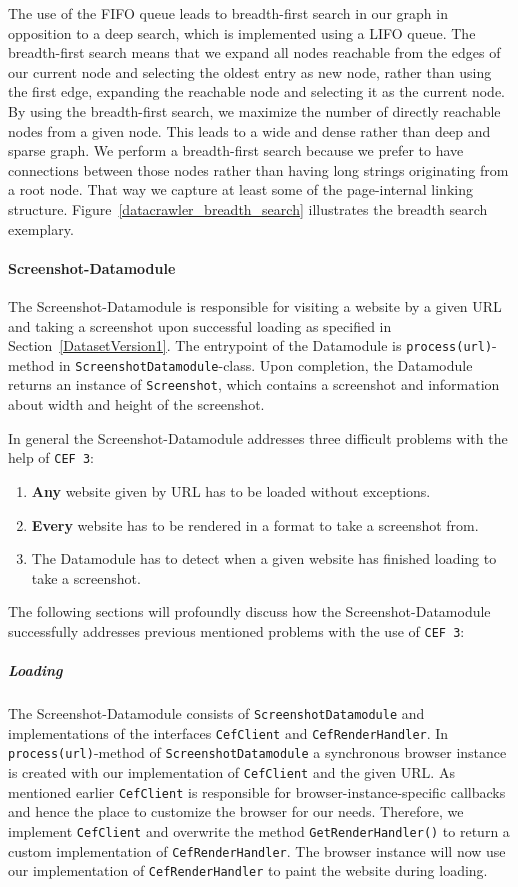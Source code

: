 The use of the FIFO queue leads to breadth-first search in our graph in opposition to a deep search, which is implemented using a LIFO queue. The breadth-first search means that we expand all nodes reachable from the edges of our current node and selecting the oldest entry as new node, rather than using the first edge, expanding the reachable node and selecting it as the current node. By using the breadth-first search, we maximize the number of directly reachable nodes from a given node. This leads to a wide and dense rather than deep and sparse graph. We perform a breadth-first search because we prefer to have connections between those nodes rather than having long strings originating from a root node. That way we capture at least some of the page-internal linking structure. Figure~\ref{datacrawler_breadth_search} illustrates the breadth search exemplary.

\paragraph*{Screenshot-Datamodule}
\label{datacrawler_screenshot_datamodule}
The Screenshot-Datamodule is responsible for visiting a website by a given URL and taking a screenshot upon successful loading as specified in Section~\ref{DatasetVersion1}. The entrypoint of the Datamodule is \texttt{process(url)}-method in \texttt{ScreenshotDatamodule}-class. Upon completion, the Datamodule returns an instance of \texttt{Screenshot}, which contains a screenshot and information about width and height of the screenshot.

In general the Screenshot-Datamodule addresses three difficult problems with the help of \texttt{CEF 3}: 

\begin{enumerate}
	\item \textbf{Any} website given by URL  has to be loaded without exceptions.
	\item \textbf{Every} website has to be rendered in a format to take a screenshot from.
	\item The Datamodule has to detect when a given website has finished loading to take a screenshot.
\end{enumerate}

The following sections will profoundly discuss how the Screenshot-Datamodule successfully addresses previous mentioned problems with the use of \texttt{CEF 3}:

\subparagraph*{Loading} 
The Screenshot-Datamodule consists of \texttt{ScreenshotDatamodule} and implementations of the interfaces \texttt{CefClient} and \texttt{CefRenderHandler}. In \texttt{process(url)}-method of \texttt{ScreenshotDatamodule} a synchronous browser instance is created with our implementation of \texttt{CefClient} and the given URL. As mentioned earlier \texttt{CefClient} is responsible for browser-instance-specific callbacks and hence the place to customize the browser for our needs. Therefore, we implement \texttt{CefClient} and overwrite the method \texttt{GetRenderHandler()} to return a custom implementation of \texttt{CefRenderHandler}. The browser instance will now use our implementation of \texttt{CefRenderHandler} to paint the website during loading.


